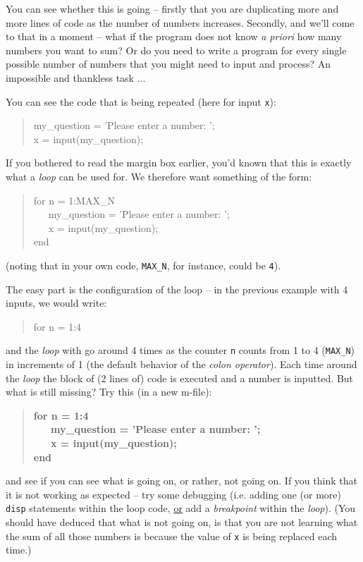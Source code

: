 \documentclass{tufte-book} %
\newenvironment{docspec}{\begin{quotation}\ttfamily\parskip0pt\parindent0pt\ignorespaces}{\end{quotation}}
\newenvironment{docspecbold}{\begin{quotation}\ttfamily\bfseries\parskip0pt\parindent0pt\ignorespaces}{\end{quotation}}
\begin{document}
You can see whether this is going -- firstly that you are duplicating more and more lines of code as the number of numbers increases. Secondly, and we'll come to that in a moment -- what if the program does not know \textit{a priori} how many numbers you want to sum? Or do you need to write a program for every single possible number of numbers that you might need to input and process? An impossible and thankless task ...

You can see the code that is being repeated (here for input \texttt{x}):
\begin{docspec}
my\_question = 'Please enter a number: ';
\\x = input(my\_question);
\end{docspec}

If you bothered to read the margin box earlier, you'd known that this is exactly what a \textit{loop} can be used for. We therefore want something of the form:
\begin{docspec}
for n = 1:MAX\_N
\\ \ \ \ my\_question = 'Please enter a number: ';
\\ \ \ \ x = input(my\_question);
\\end
\end{docspec}

\noindent (noting that in your own code, \texttt{MAX\_N}, for instance, could be \texttt{4}).

The easy part is the configuration of the loop -- in the previous example with 4 inputs, we would write:
\begin{docspec}
for n = 1:4
\end{docspec}
and the \textit{loop} with go around 4 times as the counter \texttt{n} counts from 1 to 4 (\texttt{MAX\_N}) in increments of 1 (the default behavior of the \textit{colon operator}). Each time around the \textit{loop} the block of (2 lines of) code is executed and a number is inputted. But what is still missing? Try this (in a new \textsf{m-file}): 
\begin{docspecbold}
for n = 1:4
\\ \ \ \ my\_question = 'Please enter a number: ';
\\ \ \ \ x = input(my\_question);
\\end
\end{docspecbold}
and see if you can see what is going on, or rather, not going on. If you think that it is not working as expected -- try some debugging (i.e. adding one (or more) \texttt{disp} statements within the loop code, \uline{or} add a \textit{breakpoint} within the \textit{loop}). (You should have deduced that what is not going on, is that you are not learning what the sum of all those numbers is because the value of \texttt{x} is being replaced each time.)  
\end{document}
